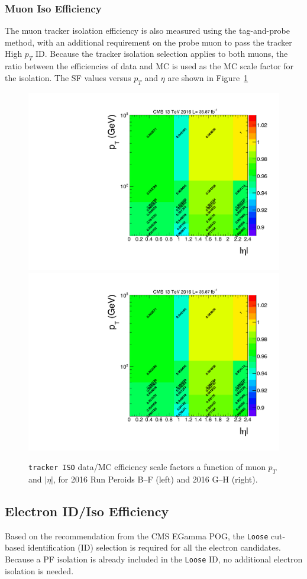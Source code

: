 \subsubsection{Muon Iso Efficiency}
The muon tracker isolation efficiency is also measured using the tag-and-probe method, with an additional requirement on the probe muon to pass the tracker High $p_T$ ID. Because the tracker isolation selection applies to both muons, the ratio between the efficiencies of data and MC is used as the MC scale factor for the isolation. The SF values versus $p_T$ and $\eta$ are shown in Figure~\ref{fig:bg_muonisosf}
\begin{figure}[htbp]
\begin{center}
\includegraphics[width=0.49\linewidth, page=7]{figures/bg_muonidisoeff.pdf}
\includegraphics[width=0.49\linewidth, page=8]{figures/bg_muonidisoeff.pdf}
\caption{\texttt{tracker ISO} data/MC efficiency scale factors a function of muon $p_T$ and $|\eta|$, for 2016 Run Peroids B--F (left) and 2016 G--H (right).}
\label{fig:bg_muonisosf}
\end{center}
\end{figure}

\subsection{Electron ID/Iso Efficiency}
Based on the recommendation from the CMS EGamma POG, the \texttt{Loose} cut-based identification (ID) selection is required for all the electron candidates. Because a PF isolation is already included in the \texttt{Loose} ID, no additional electron isolation is needed.

